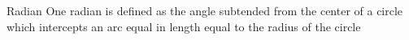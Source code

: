 \documentclass[preview]{standalone}
\begin{document}
\begin{defn*}{Radian}
  One radian is defined as the angle subtended from the center of a circle which intercepts an arc equal in length equal to the radius of the circle
\end{defn*}
\end{document}
